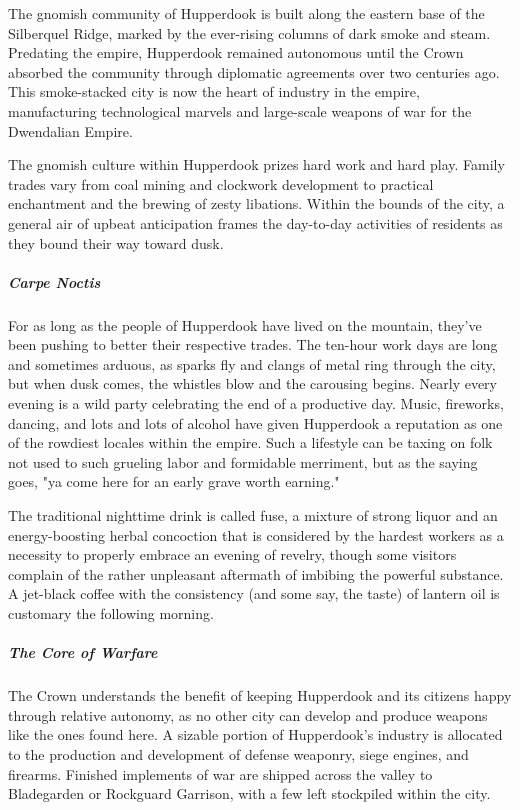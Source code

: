 \documentclass[10pt,a4paper,twoside,bg=print,twocolumn,openany,nodeprecatedcode]{dndbook}
\begin{document}
The gnomish community of Hupperdook is built along the eastern base of the Silberquel Ridge, marked by the ever-rising columns of dark smoke and steam. Predating the empire, Hupperdook remained autonomous until the Crown absorbed the community through diplomatic agreements over two centuries ago. This smoke-stacked city is now the heart of industry in the empire, manufacturing technological marvels and large-scale weapons of war for the Dwendalian Empire.

The gnomish culture within Hupperdook prizes hard work and hard play. Family trades vary from coal mining and clockwork development to practical enchantment and the brewing of zesty libations. Within the bounds of the city, a general air of upbeat anticipation frames the day-to-day activities of residents as they bound their way toward dusk.

\subparagraph{Carpe Noctis}
For as long as the people of Hupperdook have lived on the mountain, they've been pushing to better their respective trades. The ten-hour work days are long and sometimes arduous, as sparks fly and clangs of metal ring through the city, but when dusk comes, the whistles blow and the carousing begins. Nearly every evening is a wild party celebrating the end of a productive day. Music, fireworks, dancing, and lots and lots of alcohol have given Hupperdook a reputation as one of the rowdiest locales within the empire. Such a lifestyle can be taxing on folk not used to such grueling labor and formidable merriment, but as the saying goes, "ya come here for an early grave worth earning."

The traditional nighttime drink is called fuse, a mixture of strong liquor and an energy-boosting herbal concoction that is considered by the hardest workers as a necessity to properly embrace an evening of revelry, though some visitors complain of the rather unpleasant aftermath of imbibing the powerful substance. A jet-black coffee with the consistency (and some say, the taste) of lantern oil is customary the following morning.

\subparagraph{The Core of Warfare}
The Crown understands the benefit of keeping Hupperdook and its citizens happy through relative autonomy, as no other city can develop and produce weapons like the ones found here. A sizable portion of Hupperdook's industry is allocated to the production and development of defense weaponry, siege engines, and firearms. Finished implements of war are shipped across the valley to Bladegarden or Rockguard Garrison, with a few left stockpiled within the city.
\end{document}
